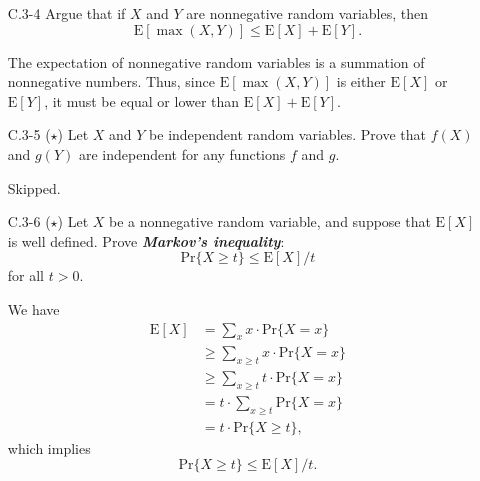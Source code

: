 \documentclass{report}
\makeatletter
\renewenvironment{framed}{%
 \def\FrameCommand##1{\hskip\@totalleftmargin
 \fboxsep=\FrameSep\fbox{##1}}%
 \MakeFramed {\advance\hsize-\width
   \@totalleftmargin\z@ \linewidth\hsize
   \@setminipage}}%
 {\par\unskip\endMakeFramed}
\makeatother
\begin{document}
\begin{enumerate}
\item[C.3{-}4]{Argue that if $X$ and $Y$ are nonnegative random variables, then
\[
  \text{E}[\max(X, Y)] \le \text{E}[X] + \text{E}[Y].
\]
}

\begin{framed}
The expectation of nonnegative random variables is a summation of nonnegative
numbers. Thus, since $\text{E}[\max(X, Y)]$ is either $\text{E}[X]$ or
$\text{E}[Y]$, it must be equal or lower than $\text{E}[X] + \text{E}[Y]$.
\end{framed}

\item[C.3{-}5]{($\star$) Let $X$ and $Y$ be independent random variables. Prove
that $f(X)$ and $g(Y)$ are independent for any functions $f$ and $g$.}

\begin{framed}
Skipped.


\end{framed}

\item[C.3{-}6]{($\star$) Let $X$ be a nonnegative random variable, and suppose
that $\text{E}[X]$ is well defined. Prove \textbf{\emph{Markov's inequality}}:
\[
  \text{Pr}\{X \ge t\} \le \text{E}[X]/t
\]
for all $t > 0$.
}

\begin{framed}
We have
\begin{equation*}
\begin{aligned}
  \text{E}[X] &=   \sum_{x}{x \cdot \text{Pr}\{X = x\}}\\
              &\ge \sum_{x \ge t}{x \cdot \text{Pr}\{X = x\}}\\
              &\ge \sum_{x \ge t}{t \cdot \text{Pr}\{X = x\}}\\
              &= t \cdot \sum_{x \ge t}{\text{Pr}\{X = x\}}\\
              &= t \cdot \text{Pr}\{X \ge t\},
\end{aligned}
\end{equation*}
which implies
\[
  \text{Pr}\{X \ge t\} \le \text{E}[X]/t.
\]
\end{framed}


\end{enumerate}
\end{document}
